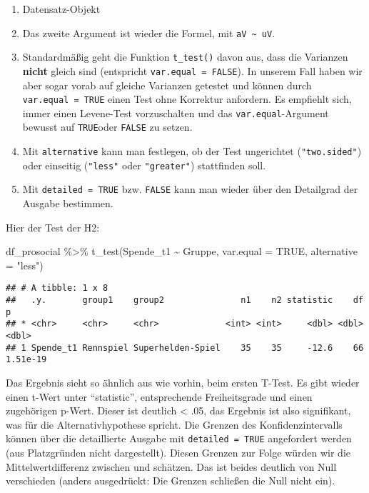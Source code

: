 \documentclass[
]{book}
\newenvironment{Shaded}{\begin{snugshade}}{\end{snugshade}}
\newcommand{\AttributeTok}[1]{\textcolor[rgb]{0.77,0.63,0.00}{#1}}
\newcommand{\ConstantTok}[1]{\textcolor[rgb]{0.00,0.00,0.00}{#1}}
\newcommand{\FunctionTok}[1]{\textcolor[rgb]{0.00,0.00,0.00}{#1}}
\newcommand{\NormalTok}[1]{#1}
\newcommand{\SpecialCharTok}[1]{\textcolor[rgb]{0.00,0.00,0.00}{#1}}
\newcommand{\StringTok}[1]{\textcolor[rgb]{0.31,0.60,0.02}{#1}}
\begin{document}
\begin{enumerate}
\def\labelenumi{\arabic{enumi}.}
\item
  Datensatz-Objekt
\item
  Das zweite Argument ist wieder die Formel, mit \texttt{aV\ \textasciitilde{}\ uV}.
\item
  Standardmäßig geht die Funktion \texttt{t\_test()} davon aus, dass die Varianzen \textbf{nicht} gleich sind (entspricht \texttt{var.equal\ =\ FALSE}). In unserem Fall haben wir aber sogar vorab auf gleiche Varianzen getestet und können durch \texttt{var.equal\ =\ TRUE} einen Test ohne Korrektur anfordern. Es empfiehlt sich, immer einen Levene-Test vorzuschalten und das \texttt{var.equal}-Argument bewusst auf \texttt{TRUE}oder \texttt{FALSE} zu setzen.
\item
  Mit \texttt{alternative} kann man festlegen, ob der Test ungerichtet (\texttt{"two.sided"}) oder einseitig (\texttt{"less"} oder \texttt{"greater"}) stattfinden soll.
\item
  Mit \texttt{detailed\ =\ TRUE} bzw. \texttt{FALSE} kann man wieder über den Detailgrad der Ausgabe bestimmen.
\end{enumerate}

Hier der Test der H2:

\begin{Shaded}
\begin{Highlighting}[]
\NormalTok{df\_prosocial }\SpecialCharTok{\%\textgreater{}\%} 
  \FunctionTok{t\_test}\NormalTok{(Spende\_t1 }\SpecialCharTok{\textasciitilde{}}\NormalTok{ Gruppe, }\AttributeTok{var.equal =} \ConstantTok{TRUE}\NormalTok{, }\AttributeTok{alternative =} \StringTok{"less"}\NormalTok{) }
\end{Highlighting}
\end{Shaded}

\begin{verbatim}
## # A tibble: 1 x 8
##   .y.       group1    group2               n1    n2 statistic    df        p
## * <chr>     <chr>     <chr>             <int> <int>     <dbl> <dbl>    <dbl>
## 1 Spende_t1 Rennspiel Superhelden-Spiel    35    35     -12.6    66 1.51e-19
\end{verbatim}

Das Ergebnis sieht so ähnlich aus wie vorhin, beim ersten T-Test. Es gibt wieder einen t-Wert unter ``statistic'', entsprechende Freiheitsgrade und einen zugehörigen p-Wert. Dieser ist deutlich \textless{} .05, das Ergebnis ist also signifikant, was für die Alternativhypothese spricht. Die Grenzen des Konfidenzintervalls können über die detaillierte Ausgabe mit \texttt{detailed\ =\ TRUE} angefordert werden (aus Platzgründen nicht dargestellt). Diesen Grenzen zur Folge würden wir die Mittelwertdifferenz zwischen  und  schätzen. Das ist beides deutlich von Null verschieden (anders ausgedrückt: Die Grenzen schließen die Null nicht ein).
\end{document}
